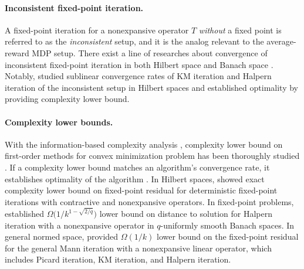 \documentclass{article} %
\newcommand*{\para}[1]{\left({#1}\right)}
\begin{document}
\paragraph{Inconsistent fixed-point iteration.}
A fixed-point iteration for a nonexpansive operator $T$ \emph{without} a fixed point is referred to as the \emph{inconsistent} setup, and it is the analog relevant to the average-reward MDP setup. There exist a line of researches about convergence of inconsistent fixed-point iteration in both Hilbert space \citep{pazy1971asymptotic, applegate2024infeasibility, bauschke2014generalized, liu2019new} and Banach space \citep{Browder1966TheSB, reich1973asymptotic,baillon1978asymptotic, reich1987asymptotic}. Notably, \citet{park2023} studied sublinear convergence rates of KM iteration and Halpern iteration of the inconsistent setup in Hilbert spaces and established optimality by providing complexity lower bound. 



\paragraph{Complexity lower bounds.}
With the information-based
complexity analysis \citep{nemirovski1992information}, complexity lower bound on first-order methods for convex minimization problem has been thoroughly studied \citep{nesterov2003Introductory, drori2017exact, drori2022oracle, carmon2020stationary1, carmon2021stationary2, drori2020stoc-complexity}. If a complexity lower bound
matches an algorithm's convergence rate, it establishes optimality
of the algorithm \citep{nemirovski1992information, kim2016optimized,salim2021optimal, taylor2021optimal, drori2016optimal-kelley, park2022exact}. 
In Hilbert spaces, 
\citet{park2022exact} showed exact complexity lower bound on fixed-point residual for deterministic fixed-point iterations with contractive and nonexpansive operators. In fixed-point problems, \citet{colao2021rate} established $\Omega\big(1/k^{1-\sqrt{2/q}}\big)$ lower bound on distance to solution for Halpern iteration with a nonexpansive operator in $q$-uniformly smooth Banach spaces. In general normed space, \citet{contreras2022optimal} provided $\Omega(1/k)$ lower bound on the fixed-point residual for the general Mann iteration with a nonexpansive linear operator, which includes Picard iteration, KM iteration, and Halpern iteration.
 
\end{document}
